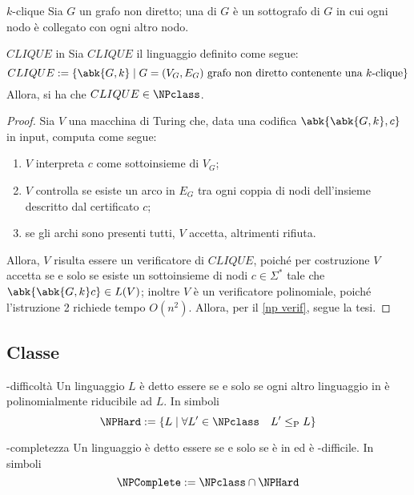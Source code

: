\documentclass[a4paper, 12pt]{report}
\begin{document}
    \begin{frameddefn}{$k$-clique}
        Sia $G$ un grafo non diretto; una  di $G$ è un sottografo di $G$ in cui ogni nodo è collegato con ogni altro nodo.
    \end{frameddefn}

    \begin{framedthm}[label={clique in np}]{$CLIQUE$ in \NPclass}
        Sia $CLIQUE$ il linguaggio definito come segue: $$CLIQUE := \{\abk{G, k} \mid G = (V_G, E_G) \ \textrm{grafo non diretto contenente una $k$-clique}\}$$ Allora, si ha che $CLIQUE \in \NPclass$.
    \end{framedthm}

    \begin{proof}
        Sia $V$ una macchina di Turing che, data una codifica $\abk{\abk{G, k}, c}$ in input, computa come segue:

        \begin{enumerate}
            \item $V$ interpreta $c$ come sottoinsieme di $V_G$;
            \item $V$ controlla se esiste un arco in $E_G$ tra ogni coppia di nodi dell'insieme descritto dal certificato $c$;
            \item se gli archi sono presenti tutti, $V$ accetta, altrimenti rifiuta.
        \end{enumerate}

        Allora, $V$ risulta essere un verificatore di $CLIQUE$, poiché per costruzione $V$ accetta se e solo se esiste un sottoinsieme di nodi $c \in \Sigma^*$ tale che $\abk{\abk{G, k} c} \in L(V)$; inoltre $V$ è un verificatore polinomiale, poiché l'istruzione 2 richiede tempo $O(n^2)$. Allora, per il \cref{np verif}, segue la tesi.
    \end{proof}

    \subsection{Classe \NPComplete}

    \begin{frameddefn}{\NPclass-difficoltà}
        Un linguaggio $L$ è detto essere  se e solo se ogni altro linguaggio in \NPclass è polinomialmente riducibile ad $L$. In simboli $$\NPHard := \{L \mid \forall L' \in \NPclass \quad L' \leq_\mathrm P L\}$$
    \end{frameddefn}

    \begin{frameddefn}[label={np completeness def}]{\NPclass-completezza}
        Un linguaggio è detto essere  se e solo se è in \NPclass ed è \NPclass-difficile. In simboli $$\NPComplete := \NPclass \cap \NPHard$$
    \end{frameddefn}
\end{document}

